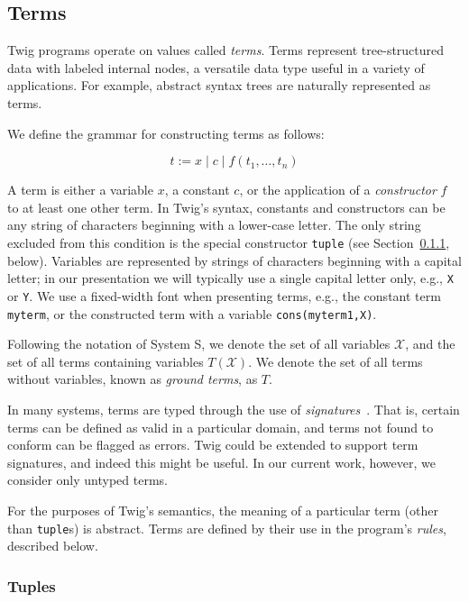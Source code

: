 
\subsection{Terms}
\label{sec:terms}

Twig programs operate on values called \emph{terms}. Terms
represent tree-structured data with labeled internal nodes, a
versatile data type useful in a variety of applications. For
example, abstract syntax trees are naturally represented as terms.

We define the grammar for constructing terms as follows:

\[
t \;\mbox{:=}\; x \;|\; c \;|\; f(t_1,\ldots,t_n)
\]

A term is either a variable $x$, a constant $c$, or the
application of a \emph{constructor} $f$ to at least one other
term. In Twig's syntax, constants and constructors can be any
string of characters beginning with a lower-case letter. The only
string excluded from this condition is the special constructor
\texttt{tuple} (see Section~\ref{sec:tuples}, below). Variables
are represented by strings of characters beginning with a capital
letter; in our presentation we will typically use a single capital
letter only, e.g., \texttt{X} or \texttt{Y}. We use a fixed-width
font when presenting terms, e.g., the constant term
\texttt{myterm}, or the constructed term with a variable
\texttt{cons(myterm1,X)}.

Following the notation of System S, we denote the set of all
variables $\mathcal{X}$, and the set of all terms containing
variables $T(\mathcal{X})$. We denote the set of all terms without
variables, known as \emph{ground terms}, as $T$.

In many systems, terms are typed through the use of
\emph{signatures}~\cite{baader98rewriting}. That is, certain terms
can be defined as valid in a particular domain, and terms not
found to conform can be flagged as errors. Twig could be extended
to support term signatures, and indeed this might be useful. In
our current work, however, we consider only untyped terms.

For the purposes of Twig's semantics, the meaning of a particular
term (other than \texttt{tuple}s) is abstract. Terms are defined
by their use in the program's \emph{rules}, described below.


\subsubsection{Tuples}
\label{sec:tuples}

